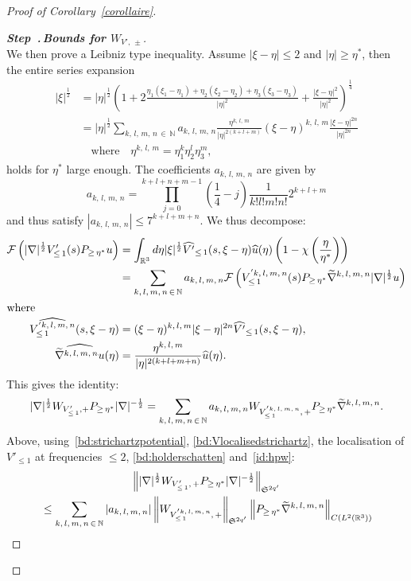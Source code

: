 \documentclass[AHL, Unicode, longabstracts,published]{cedram}
\newcommand{\R}{\mathbb{R}}
\newcommand{\N}{\mathbb{N}}
\newcommand{\mclF}{\mathcal{F}}
\newcommand{\frkS}{\mathfrak{S}}
\newcounter{stepcount}
\newenvironment{step}[1]{\refstepcounter{stepcount}\begin{proof}[{\bf{Step~\thestepcount}{.\,\emph{#1}}}]}{\let\qed\relax\end{proof}}
\let\oldtilde\tilde
\renewcommand*{\tilde}[1]{\mathchoice{\widetilde{#1}}{\widetilde{#1}}{\oldtilde{#1}}{\oldtilde{#1}}}
\let\oldhat\hat
\renewcommand*{\hat}[1]{\mathchoice{\widehat{#1}}{\widehat{#1}}{\oldhat{#1}}{\oldhat{#1}}}
\begin{document}
\begin{proof}[Proof of Corollary~\ref{corollaire}]
\begin{step}{{Bounds for $W_{V',\,\pm}$}}
\[\]
We then prove a Leibniz type inequality. Assume $|\xi-\eta|\leq 2$ and $|\eta|\geq \eta^*$, then the entire series expansion
\begin{align*}
|\xi|^{\frac 12} &=|\eta|^{\frac 12}\left(1+2\frac{\eta_1(\xi_1-\eta_1)+\eta_2(\xi_2-\eta_2)+\eta_3(\xi_3-\eta_3)}{|\eta|^2}+\frac{|\xi-\eta|^2}{|\eta|^2}\right)^{\frac 14}\\
& =|\eta|^{\frac 12}\sum_{k,\,l,\,m,\,n\,\in\,\N}a_{k,\,l,\,m,\,n} \frac{\eta^{k,\,l,\,m}}{|\eta|^{2(k+l+m)}}(\xi-\eta)^{k,\,l,\,m} \frac{|\xi-\eta|^{2n}}{|\eta|^{2n}}\\
&\quad\text{where}\quad \eta^{k,\,l,\,m}=\eta_1^k\eta_2^l\eta_3^m,
\end{align*}
holds for $\eta^*$ large enough. The coefficients $a_{k,\,l,\,m,\,n}$ are given by
\[
a_{k,\,l,\,m,\,n} = \prod_{j=0}^{k+l+n+m-1} \left(\frac14 -j\right) \frac1{k!l!m!n!} 2^{k+l+m}
\]
and thus satisfy $|a_{k,\,l,\,m,\,n}|\leq 7^{k+l+m+n}$. We thus decompose:
\begin{align*}
\mclF\left(|\nabla|^{\frac 12} V'_{\leq\,1}(s)P_{\geq\, \eta^*}u \right) & = \int_{\R^3}d\eta |\xi|^{\frac 12} \widehat{ V'}_{\leq\,1}(s,\xi-\eta)\hat u(\eta) \left(1-\chi\left(\frac{\eta}{\eta^*}\right)\right) \\
&= \sum_{k,\,l,\,m,\,n\,\in\,\N} a_{k,\,l,\,m,\,n} \mclF\left(V^{'k,\,l,\,m,\,n}_{\leq\,1}(s) P_{\geq\, \eta^*} \tilde \nabla^{k,\,l,\,m,\,n} |\nabla|^{\frac 12}u \right)
\\
\intertext{where}
\widehat{V^{'k,\,l,\,m,\,n}_{\leq\,1}}(s,\xi-\eta) &=(\xi-\eta)^{k,\,l,\,m}|\xi-\eta|^{2n}\widehat{V'}_{\leq\,1}(s,\xi-\eta), \\
 \widehat{\tilde \nabla^{k,\,l,\,m,\,n}u}(\eta) &=\frac{\eta^{k,\,l,\,m}}{|\eta|^{2(k+l+m+n)}}\hat u(\eta).
\end{align*}
This gives the identity:
\[
|\nabla |^{\frac 12}W_{V'_{\leq\,1},+}P_{\geq\,\eta^*} |\nabla |^{-\frac 12} =\sum_{k,\,l,\,m,\,n\,\in\,\N}a_{k,\,l,\,m,\,n} W_{V^{'k,\,l,\,m,\,n}_{\leq\,1},\,+}P_{\geq\,\eta^*} \tilde \nabla^{k,\,l,\,m,\,n}.
\]
Above, using~\eqref{bd:strichartzpotential}, \eqref{bd:Vlocalisedstrichartz}, the localisation of $V'_{\leq 1}$ at frequencies $\leq 2$, \eqref{bd:holderschatten} and~\eqref{id:hpw}:
\begin{multline}\label{bc:interWV3}
\left \| |\nabla |^{\frac 12}W_{V'_{\leq\,1},\,+}P_{\geq\,\eta^*} |\nabla |^{-\frac 12}\right\|_{\frkS^{2q'}}\\
\begin{aligned} 
&\leq \sum_{k,\,l,\,m,\,n\,\in\,\N} \left|a_{k,\,l,\,m,\,n}\right| \left\| W_{V^{'k,\,l,\,m,\,n}_{\leq\,1},\,+}\right\|_{\frkS^{2q'}} \left\| P_{\geq\,\eta^*} \tilde \nabla^{k,\,l,\,m,\,n}\right\|_{C\left(L^2\left(\R^3\right)\right)}\\

\end{aligned}
\end{multline}
\end{step}
\end{proof}
\end{document}
